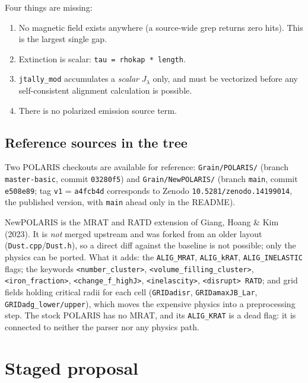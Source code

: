 \documentclass{my_memo}
\newcommand{\code}[1]{\texttt{#1}}
\begin{document}
Four things are missing:
\begin{enumerate}
\item No magnetic field exists anywhere (a source-wide grep returns zero
      hits). This is the largest single gap.
\item Extinction is scalar: \code{tau = rhokap * length}.
\item \code{jtally\_mod} accumulates a \emph{scalar} $J_\lambda$ only,
      and must be vectorized before any self-consistent alignment
      calculation is possible.
\item There is no polarized emission source term.
\end{enumerate}

\subsection{Reference sources in the tree}

Two POLARIS checkouts are available for reference:
\code{Grain/POLARIS/} (branch \code{master-basic}, commit
\code{03280f5}) and \code{Grain/NewPOLARIS/} (branch \code{main}, commit
\code{e508e89}; tag \code{v1} = \code{a4fcb4d} corresponds to Zenodo
\code{10.5281/zenodo.14199014}, the published version, with \code{main}
ahead only in the README).

NewPOLARIS is the MRAT and RATD extension of Giang, Hoang \& Kim (2023).
It is \emph{not} merged upstream and was forked from an older layout
(\code{Dust.cpp}/\code{Dust.h}), so a direct diff against the baseline is
not possible; only the physics can be ported. What it adds: the
\code{ALIG\_MRAT}, \code{ALIG\_kRAT}, \code{ALIG\_INELASTIC} flags; the
keywords \code{<number\_cluster>}, \code{<volume\_filling\_cluster>},
\code{<iron\_fraction>}, \code{<change\_f\_highJ>}, \code{<inelascity>},
\code{<disrupt> RATD}; and grid fields holding critical radii for each
cell (\code{GRIDadisr}, \code{GRIDamaxJB\_Lar},
\code{GRIDadg\_lower/upper}), which moves the expensive physics into a
preprocessing step. The stock POLARIS has no MRAT, and its
\code{ALIG\_KRAT} is a dead flag: it is connected to neither the parser
nor any physics path.

\section{Staged proposal}
\label{sec:stages}
\end{document}
